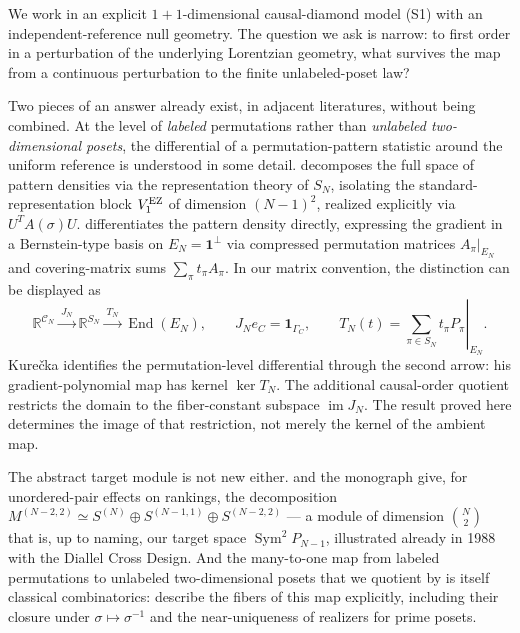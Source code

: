 \documentclass[11pt]{article}
\begin{document}
We work in an explicit $1+1$-dimensional causal-diamond model (S1) with an independent-reference null geometry. The question we ask is narrow: to first order in a perturbation of the underlying Lorentzian geometry, what survives the map from a continuous perturbation to the finite unlabeled-poset law?

Two pieces of an answer already exist, in adjacent literatures, without being combined. At the level of \emph{labeled} permutations rather than \emph{unlabeled two-dimensional posets}, the differential of a permutation-pattern statistic around the uniform reference is understood in some detail. \citet{EvenZohar2020} decomposes the full space of pattern densities via the representation theory of $S_N$, isolating the standard-representation block $V_1^{\rm EZ}$ of dimension $(N-1)^2$, realized explicitly via $U^TA(\sigma)U$. \citet{Kurecka2022} differentiates the pattern density directly, expressing the gradient in a Bernstein-type basis on $E_N=\mathbf1^\perp$ via compressed permutation matrices $A_\pi|_{E_N}$ and covering-matrix sums $\sum_\pi t_\pi A_\pi$. In our matrix convention, the distinction can be displayed as
\[
\mathbb R^{\mathcal C_N}
\xrightarrow{\ J_N\ }
\mathbb R^{S_N}
\xrightarrow{\ T_N\ }
\operatorname{End}(E_N),
\qquad
J_Ne_C=\mathbf1_{\Gamma_C},
\qquad
T_N(t)=\left.\sum_{\pi\in S_N}t_\pi P_\pi\right|_{E_N}.
\tag{1.1}
\]
Kure\v{c}ka identifies the permutation-level differential through the second arrow: his gradient-polynomial map has kernel $\ker T_N$. The additional causal-order quotient restricts the domain to the fiber-constant subspace $\operatorname{im}J_N$. The result proved here determines the image of that restriction, not merely the kernel of the ambient map.

The abstract target module is not new either. \citet{Diaconis1989} and the monograph \citep{Diaconis1988} give, for unordered-pair effects on rankings, the decomposition $M^{(N-2,2)}\simeq S^{(N)}\oplus S^{(N-1,1)}\oplus S^{(N-2,2)}$ --- a module of dimension $\binom N2$ that is, up to naming, our target space $\operatorname{Sym}^2P_{N-1}$, illustrated already in 1988 with the Diallel Cross Design. And the many-to-one map from labeled permutations to unlabeled two-dimensional posets that we quotient by is itself classical combinatorics: \citet{BayoumiElZaharKhamis1994} describe the fibers of this map explicitly, including their closure under $\sigma\mapsto \sigma^{-1}$ and the near-uniqueness of realizers for prime posets.
\end{document}

